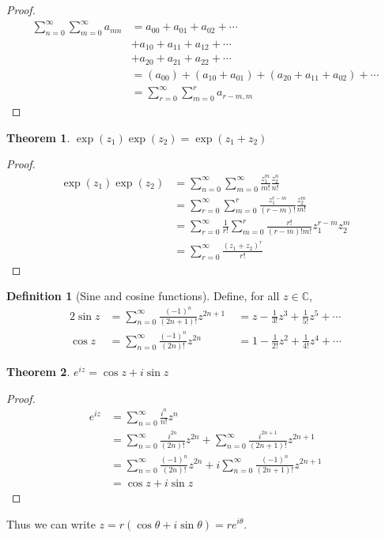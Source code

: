 \documentclass[a4paper]{article}
\theoremstyle{definition}
\newtheorem*{thm}{Theorem}
\newtheorem*{defi}{Definition}
\newcommand{\C}{\mathbb{C}}
\begin{document}
\begin{proof}
  \begin{align*}
    \sum_{n = 0}^\infty\sum_{m = 0}^\infty a_{mn} &= a_{00} + a_{01} + a_{02} + \cdots\\
    &+ a_{10} + a_{11} + a_{12} + \cdots\\
    &+ a_{20} + a_{21} + a_{22} + \cdots\\
    &= (a_{00}) + (a_{10} + a_{01}) + (a_{20} + a_{11} + a_{02}) + \cdots\\
    &= \sum_{r = 0}^\infty\sum_{m = 0}^r a_{r - m, m}
  \end{align*}
\end{proof}
\begin{thm}
  $\exp(z_1)\exp(z_2) = \exp(z_1 + z_2)$
\end{thm}

\begin{proof}
  \begin{align*}
    \exp(z_1)\exp(z_2) &= \sum_{n = 0}^\infty\sum_{m = 0}^\infty \frac{z_1^m}{m!}\frac{z_2^n}{n!}\\
    &= \sum_{r = 0}^\infty\sum_{m = 0}^r \frac{z_1^{r - m}}{(r - m)!}\frac{z_2^m}{m!}\\
    &= \sum_{r = 0}^\infty\frac{1}{r!}\sum_{m = 0}^r \frac{r!}{(r - m)!m!}z_1^{r - m}z_2^m\\
    &= \sum_{r = 0}^\infty\frac{(z_1 + z_2)^r}{r!}
  \end{align*}
\end{proof}

\begin{defi}[Sine and cosine functions]
  Define, for all $z\in \C$,
  \begin{alignat*}{2}
    \sin z &= \sum_{n=0}^\infty \frac{(-1)^n}{(2n+1)!}z^{2n+1} &\;= z - \frac{1}{3!}z^3 + \frac{1}{5!}z^5 + \cdots\\
    \cos z &= \sum_{n=0}^\infty \frac{(-1)^n}{(2n)!}z^{2n} &\;= 1 - \frac{1}{2!}z^2 + \frac{1}{4!}z^4 + \cdots
  \end{alignat*}
\end{defi}

\begin{thm}
  $e^{iz} = \cos z + i\sin z$
\end{thm}

\begin{proof}
  \begin{align*}
  e^{iz} &= \sum_{n=0}^\infty \frac{i^n}{n!}z^n\\
  &= \sum_{n=0}^\infty \frac{i^{2n}}{(2n)!}z^{2n} + \sum_{n=0}^\infty \frac{i^{2n+1}}{(2n+1)!}z^{2n+1}\\
  &= \sum_{n=0}^\infty \frac{(-1)^n}{(2n)!}z^{2n} + i \sum_{n=0}^\infty \frac{(-1)^n}{(2n+1)!}z^{2n+1}\\
  &= \cos z + i\sin z
  \end{align*}
\end{proof}
Thus we can write $z = r(\cos\theta + i\sin\theta) = re^{i\theta}$.
\end{document}
